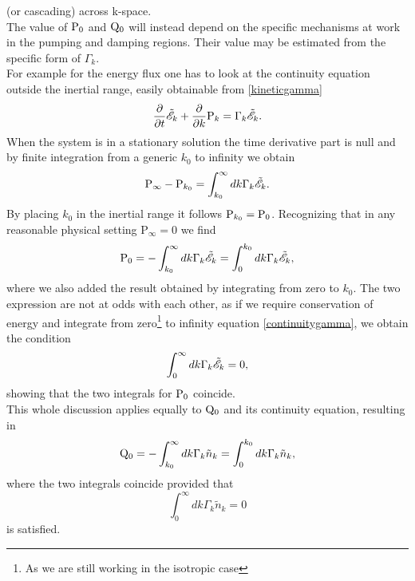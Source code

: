 (or cascading) across k-space.\\
The value of $\mathrm{P}_0$ and $\mathrm{Q}_0$ will instead depend on the specific mechanisms at work in the pumping and damping regions. Their value may be estimated 
from the specific form of $\Gamma_k$. \\
For example for the energy flux one has to look at the continuity equation outside the inertial range, easily obtainable from \eqref{kineticgamma} 
\begin{equation}
    \frac{\partial}{\partial t} \tilde{\mathscr{E}}_k + \frac{\partial}{\partial k}  \mathrm{P}_k = \Gamma_k \tilde{\mathscr{E}}_k. 
    \label{continuitygamma}
\end{equation}
When the system is in a stationary solution the time derivative part is null and by finite integration from a generic $k_0$ to infinity we obtain
\begin{equation}
\mathrm{P}_{\infty} - \mathrm{P}_{k_0} = \int_{k_0}^{\infty} dk \Gamma_k \tilde{\mathscr{E}}_k.
\end{equation}
By placing $k_0$ in the inertial range it follows $\mathrm{P}_{k_0} = \mathrm{P}_0$. Recognizing that in any reasonable physical setting $\mathrm{P}_{\infty} = 0$ we find
\begin{equation}
    \mathrm{P}_0 = - \int_{k_0}^{\infty} dk \Gamma_k \tilde{\mathscr{E}}_k = \int_{0}^{k_0} dk \Gamma_k \tilde{\mathscr{E}}_k,
\end{equation}
where we also added the result obtained by integrating from zero to $k_0$. The two expression are not at odds with each other, as if we require conservation of energy 
and integrate from zero\footnote{As we are still working in the isotropic case} to infinity equation \eqref{continuitygamma}, we obtain the condition 
\begin{equation}
    \int_{0}^{\infty} dk \Gamma_k\tilde{\mathscr{E}}_k = 0, 
\end{equation}
showing that the two integrals for $\mathrm{P}_0$ coincide. \\
This whole discussion applies equally to $\mathrm{Q}_0$ and its continuity equation, resulting in 
\begin{equation}
    \mathrm{Q}_0 = - \int_{k_0}^{\infty} dk \Gamma_k \tilde{n}_k = \int_{0}^{k_0} dk \Gamma_k \tilde{n}_k,
\end{equation}
where the two integrals coincide provided that 
\begin{equation}
    \int_{0}^{\infty} dk \Gamma_k\tilde{n}_k = 0
\end{equation}
is satisfied. \\


